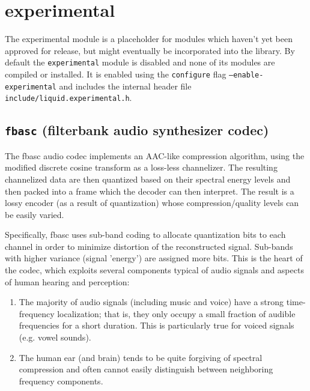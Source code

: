 % 
%

\newpage
\section{experimental}
\label{module:experimental}

The experimental module is a placeholder for modules which haven't yet
been approved for release, but might eventually be incorporated into the
library.
By default the {\tt experimental} module is disabled and none of its
modules are compiled or installed.
It is enabled using the {\tt configure} flag {\tt --enable-experimental}
and includes the internal header file
{\tt include/liquid.experimental.h}.

\subsection{{\tt fbasc} (filterbank audio synthesizer codec)}
\label{module:experimental:fbasc}

The fbasc audio codec implements an AAC-like compression algorithm, using the
modified discrete cosine transform as a loss-less channelizer.  The resulting
channelized data are then quantized based on their spectral energy levels and
then packed into a frame which the decoder can then interpret. The result is a
lossy encoder (as a result of quantization) whose compression/quality levels
can be easily varied.


Specifically, fbasc uses sub-band coding to allocate quantization bits to each
channel in order to minimize distortion of the reconstructed signal. Sub-bands
with higher variance (signal 'energy') are assigned more bits.  This is the
heart of the codec, which exploits several components typical of audio signals
and aspects of human hearing and perception:
\begin{enumerate}
\item The majority of audio signals (including music and voice) have a
      strong time-frequency localization; that is, they only occupy a small
      fraction of audible frequencies for a short duration.  This is
      particularly true for voiced signals (e.g. vowel sounds).
\item The human ear (and brain) tends to be quite forgiving of spectral
      compression and often cannot easily distinguish between neighboring
      frequency components.
\end{enumerate}

